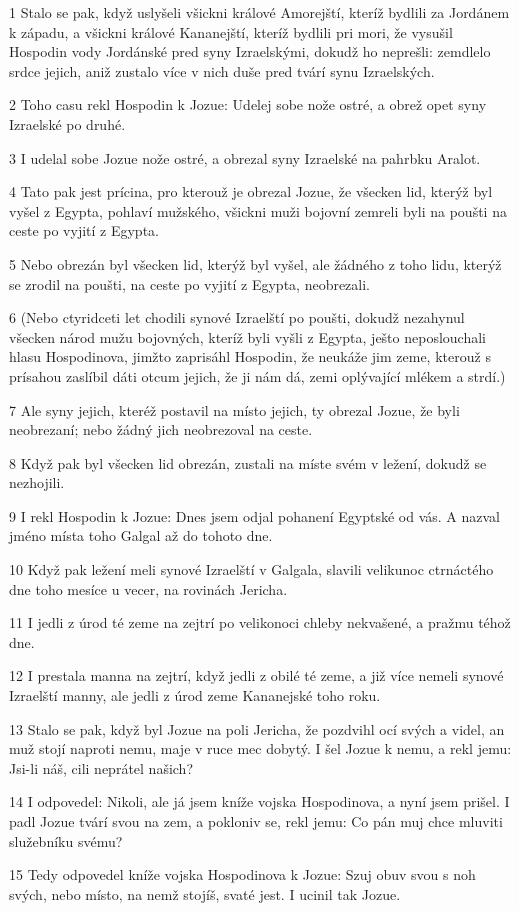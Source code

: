 \par 1 Stalo se pak, když uslyšeli všickni králové Amorejští, kteríž bydlili za Jordánem k západu, a všickni králové Kananejští, kteríž bydlili pri mori, že vysušil Hospodin vody Jordánské pred syny Izraelskými, dokudž ho neprešli: zemdlelo srdce jejich, aniž zustalo více v nich duše pred tvárí synu Izraelských.
\par 2 Toho casu rekl Hospodin k Jozue: Udelej sobe nože ostré, a obrež opet syny Izraelské po druhé.
\par 3 I udelal sobe Jozue nože ostré, a obrezal syny Izraelské na pahrbku Aralot.
\par 4 Tato pak jest prícina, pro kterouž je obrezal Jozue, že všecken lid, kterýž byl vyšel z Egypta, pohlaví mužského, všickni muži bojovní zemreli byli na poušti na ceste po vyjití z Egypta.
\par 5 Nebo obrezán byl všecken lid, kterýž byl vyšel, ale žádného z toho lidu, kterýž se zrodil na poušti, na ceste po vyjití z Egypta, neobrezali.
\par 6 (Nebo ctyridceti let chodili synové Izraelští po poušti, dokudž nezahynul všecken národ mužu bojovných, kteríž byli vyšli z Egypta, ješto neposlouchali hlasu Hospodinova, jimžto zaprisáhl Hospodin, že neukáže jim zeme, kterouž s prísahou zaslíbil dáti otcum jejich, že ji nám dá, zemi oplývající mlékem a strdí.)
\par 7 Ale syny jejich, kteréž postavil na místo jejich, ty obrezal Jozue, že byli neobrezaní; nebo žádný jich neobrezoval na ceste.
\par 8 Když pak byl všecken lid obrezán, zustali na míste svém v ležení, dokudž se nezhojili.
\par 9 I rekl Hospodin k Jozue: Dnes jsem odjal pohanení Egyptské od vás. A nazval jméno místa toho Galgal až do tohoto dne.
\par 10 Když pak ležení meli synové Izraelští v Galgala, slavili velikunoc ctrnáctého dne toho mesíce u vecer, na rovinách Jericha.
\par 11 I jedli z úrod té zeme na zejtrí po velikonoci chleby nekvašené, a pražmu téhož dne.
\par 12 I prestala manna na zejtrí, když jedli z obilé té zeme, a již více nemeli synové Izraelští manny, ale jedli z úrod zeme Kananejské toho roku.
\par 13 Stalo se pak, když byl Jozue na poli Jericha, že pozdvihl ocí svých a videl, an muž stojí naproti nemu, maje v ruce mec dobytý. I šel Jozue k nemu, a rekl jemu: Jsi-li náš, cili neprátel našich?
\par 14 I odpovedel: Nikoli, ale já jsem kníže vojska Hospodinova, a nyní jsem prišel. I padl Jozue tvárí svou na zem, a pokloniv se, rekl jemu: Co pán muj chce mluviti služebníku svému?
\par 15 Tedy odpovedel kníže vojska Hospodinova k Jozue: Szuj obuv svou s noh svých, nebo místo, na nemž stojíš, svaté jest. I ucinil tak Jozue.

